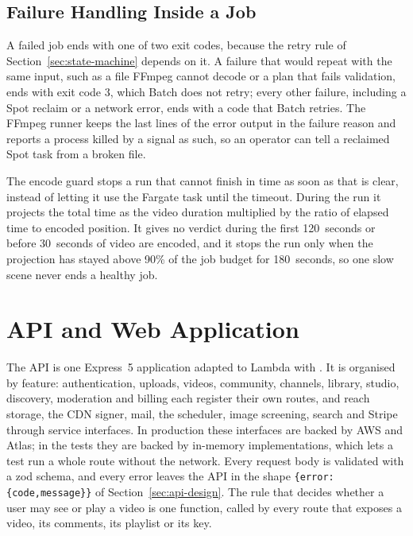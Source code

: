\subsection{Failure Handling Inside a Job}
\label{sec:job-failure-impl}

A failed job ends with one of two exit codes, because the retry rule of
Section~\ref{sec:state-machine} depends on it. A failure that would repeat with the same input, such
as a file FFmpeg cannot decode or a plan that fails validation, ends with exit code 3, which Batch
does not retry; every other failure, including a Spot reclaim or a network error, ends with a code
that Batch retries. The FFmpeg runner keeps the last lines of the error output in the failure reason
and reports a process killed by a signal as such, so an operator can tell a reclaimed Spot task from
a broken file.

The encode guard stops a run that cannot finish in time as soon as that is clear, instead of letting it
use the Fargate task until the timeout. During the run it projects the total time as the video
duration multiplied by the ratio of elapsed time to encoded position. It gives no verdict during the
first 120~seconds or before 30~seconds of video are encoded, and it stops the run only when the
projection has stayed above 90\% of the job budget for 180~seconds, so one slow scene never ends a
healthy job.

\section{API and Web Application}
\label{sec:backend-impl}

The API is one Express~5 application adapted to Lambda with . It is
organised by feature: authentication, uploads, videos, community, channels, library, studio,
discovery, moderation and billing each register their own routes, and reach storage, the CDN signer,
mail, the scheduler, image screening, search and Stripe through service interfaces. In production these interfaces are
backed by AWS and Atlas; in the tests they are backed by in-memory implementations, which lets a test
run a whole route without the network. Every request body is validated with a zod schema, and every
error leaves the API in the shape \mbox{\texttt{\{error:\{code,message\}\}}} of Section~\ref{sec:api-design}.
The rule that decides whether a user may see or play a video is one function, called by every route
that exposes a video, its comments, its playlist or its key.

